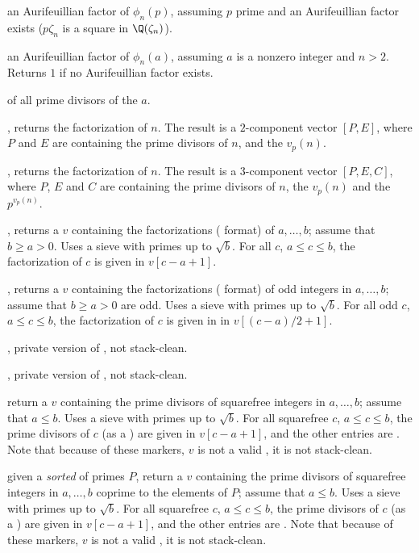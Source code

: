  an Aurifeuillian factor
of $\phi_n(p)$, assuming $p$ prime and an Aurifeuillian factor exists
($p \zeta_n$ is a square in $\Q(\zeta_n)$).

 an Aurifeuillian factor of
$\phi_n(a)$, assuming $a$ is a nonzero integer and $n > 2$. Returns $1$
if no Aurifeuillian factor exists.

  of all prime divisors of the
 $a$.

, returns the factorization of $n$. The result
is a $2$-component vector $[P,E]$, where $P$ and $E$ are 
containing the prime divisors of $n$, and the $v_p(n)$.

, returns the factorization of $n$. The result
is a $3$-component vector $[P,E,C]$, where $P$, $E$ and $C$ are
 containing the prime divisors of $n$, the $v_p(n)$
and the $p^{v_p(n)}$.

, returns a  $v$ containing
the factorizations ( format) of $a,\dots, b$; assume that $b
\geq a > 0$. Uses a sieve with primes up to $\sqrt{b}$. For all
$c$, $a \leq c \leq b$, the factorization of $c$ is given in $v[c-a+1]$.

, returns a  $v$ containing
the factorizations ( format) of odd integers in $a,\dots, b$;
assume that $b \geq a > 0$ are odd. Uses a sieve with primes up to
$\sqrt{b}$. For all odd $c$, $a \leq c \leq b$, the factorization of $c$ is
given in in $v[(c-a)/2 + 1]$.

, private version of
, not stack-clean.

, private version of
, not stack-clean.

 return a  $v$
containing the prime divisors of squarefree integers in $a,\dots,b$; assume
that $a \leq b$. Uses a sieve with primes up to $\sqrt{b}$.
For all squarefree $c$, $a\leq c\leq b$, the prime divisors of $c$ (as a
) are given in $v[c-a+1]$, and the other entries are
. Note that because of these  markers, $v$ is not a valid
, it is not stack-clean.

given a \emph{sorted}  of primes $P$, return a  $v$
containing the prime divisors of squarefree integers in $a,\dots,b$ coprime to
the elements of $P$; assume that $a \leq b$. Uses a sieve with primes up to
$\sqrt{b}$. For all squarefree $c$, $a\leq c\leq b$, the prime divisors of $c$
(as a ) are given in $v[c-a+1]$, and the other entries are
. Note that because of these  markers, $v$ is not a valid
, it is not stack-clean.

